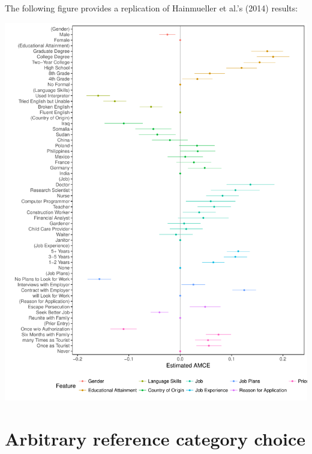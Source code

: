 \documentclass[a4paper,12pt]{article}\usepackage[]{graphicx}\usepackage[]{color}
\makeatletter
\def\maxwidth{ %
  \ifdim\Gin@nat@width>\linewidth
    \linewidth
  \else
    \Gin@nat@width
  \fi
}
\newenvironment{kframe}{%
 \def\at@end@of@kframe{}%
 \ifinner\ifhmode%
  \def\at@end@of@kframe{\end{minipage}}%
  \begin{minipage}{\columnwidth}%
 \fi\fi%
 \def\FrameCommand##1{\hskip\@totalleftmargin \hskip-\fboxsep
 \colorbox{shadecolor}{##1}\hskip-\fboxsep
     \hskip-\linewidth \hskip-\@totalleftmargin \hskip\columnwidth}%
 \MakeFramed {\advance\hsize-\width
   \@totalleftmargin\z@ \linewidth\hsize
   \@setminipage}}%
 {\par\unskip\endMakeFramed%
 \at@end@of@kframe}
\newenvironment{knitrout}{}{} %
\makeatother
\begin{document}






The following figure provides a replication of Hainmueller et al.'s (2014) results:

\begin{knitrout}
\color{fgcolor}\begin{kframe}


{\ttfamily\noindent\itshape\color{messagecolor}{\#\# Loading required namespace: ggstance}}\end{kframe}
\includegraphics[width=\maxwidth]{figure/r_hainmueller_immigration-1} 

\end{knitrout}

\clearpage



\section{Arbitrary reference category choice}
\end{document}
